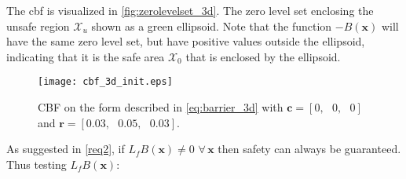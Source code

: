 The \gls{cbf} is visualized in \autoref{fig:zerolevelset_3d}. The zero level set enclosing the unsafe region $\mathcal{X}_u$ shown as a green ellipsoid. Note that the function $-B(\mathbf{x})$ will have the same zero level set, but have positive values outside the ellipsoid, indicating that it is the safe area $\mathcal{X}_0$ that is enclosed by the ellipsoid.
\vspace{-0.5cm}
\begin{figure}[H]
\centering
	\hspace*{-3cm}
	\texttt{[image: cbf\_3d\_init.eps]}
	\caption{CBF on the form described in \autoref{eq:barrier_3d} with  $\mathbf{c}= [0,\,\,\,\, 0,\,\,\,\, 0]$ and $\mathbf{r}=[0.03,\,\,\,\, 0.05,\,\,\,\, 0.03]$.}
	\label{fig:zerolevelset_3d}
\end{figure}
%
As suggested in \autoref{req2}, if $L_fB(\textbf{x})\neq 0\,\, \forall \, \textbf{x}$ then safety can always be guaranteed. Thus testing $L_fB(\textbf{x})$:
